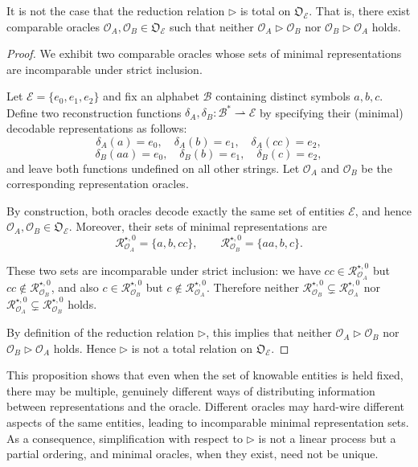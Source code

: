\begin{proposition}
It is not the case that the reduction relation \(\triangleright\) is total on
\(\mathfrak{O}_{\mathcal{E}}\).
That is, there exist comparable oracles
\(\mathcal{O}_A,\mathcal{O}_B\in\mathfrak{O}_{\mathcal{E}}\) such that neither
\(\mathcal{O}_A \triangleright \mathcal{O}_B\) nor
\(\mathcal{O}_B \triangleright \mathcal{O}_A\) holds.
\end{proposition}
\begin{proof}
We exhibit two comparable oracles whose sets of minimal representations are
incomparable under strict inclusion.

Let \(\mathcal{E}=\{e_0,e_1,e_2\}\) and fix an alphabet \(\mathcal{B}\) containing distinct symbols
\(a,b,c\).
Define two reconstruction functions
\(\delta_A,\delta_B:\mathcal{B}^\ast\rightharpoonup\mathcal{E}\) by specifying their
(minimal) decodable representations as follows:
\[
\delta_A(a)=e_0,\quad \delta_A(b)=e_1,\quad \delta_A(cc)=e_2,
\]
\[
\delta_B(aa)=e_0,\quad \delta_B(b)=e_1,\quad \delta_B(c)=e_2,
\]
and leave both functions undefined on all other strings.
Let \(\mathcal{O}_A\) and \(\mathcal{O}_B\) be the corresponding representation oracles.

By construction, both oracles decode exactly the same set of entities \(\mathcal{E}\), and hence
\(\mathcal{O}_A,\mathcal{O}_B\in\mathfrak{O}_{\mathcal{E}}\).
Moreover, their sets of minimal representations are
\[
\mathcal{R}^{\star,0}_{\mathcal{O}_A}=\{a,b,cc\},
\qquad
\mathcal{R}^{\star,0}_{\mathcal{O}_B}=\{aa,b,c\}.
\]

These two sets are incomparable under strict inclusion: we have
\(cc\in\mathcal{R}^{\star,0}_{\mathcal{O}_A}\) but
\(cc\notin\mathcal{R}^{\star,0}_{\mathcal{O}_B}\), and also
\(c\in\mathcal{R}^{\star,0}_{\mathcal{O}_B}\) but
\(c\notin\mathcal{R}^{\star,0}_{\mathcal{O}_A}\).
Therefore neither
\(\mathcal{R}^{\star,0}_{\mathcal{O}_B}\subsetneq \mathcal{R}^{\star,0}_{\mathcal{O}_A}\) nor
\(\mathcal{R}^{\star,0}_{\mathcal{O}_A}\subsetneq \mathcal{R}^{\star,0}_{\mathcal{O}_B}\) holds.

By definition of the reduction relation \(\triangleright\), this implies that neither
\(\mathcal{O}_A \triangleright \mathcal{O}_B\) nor
\(\mathcal{O}_B \triangleright \mathcal{O}_A\) holds.
Hence \(\triangleright\) is not a total relation on \(\mathfrak{O}_{\mathcal{E}}\).
\end{proof}

This proposition shows that even when the set of knowable entities is held fixed, there may be multiple, genuinely different ways of distributing information between representations and the oracle.
Different oracles may hard-wire different aspects of the same entities, leading to incomparable minimal representation sets. As a consequence, simplification with respect to \(\triangleright\) is not a linear process but a partial ordering, and minimal oracles, when they exist, need not be unique.

